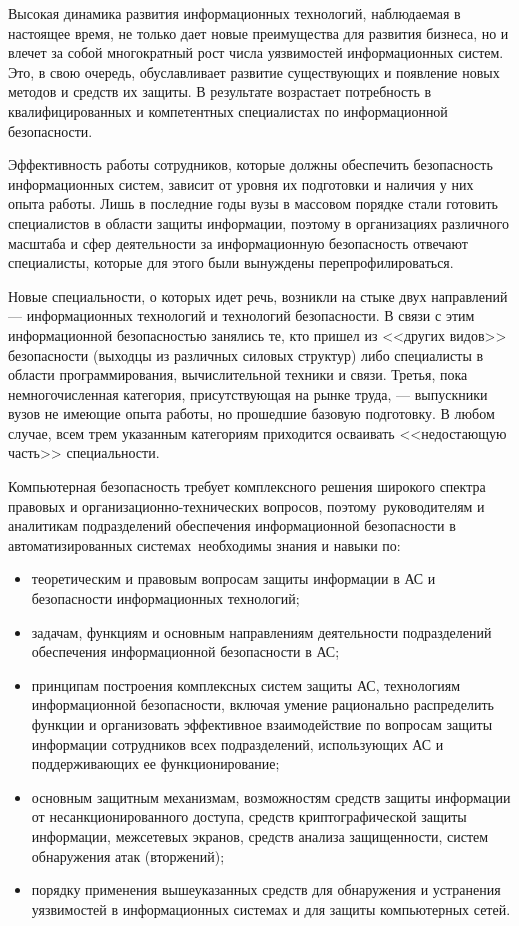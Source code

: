 Высокая динамика развития информационных технологий, наблюдаемая в настоящее время,
не только дает новые преимущества для развития бизнеса,
но и влечет за собой многократный рост числа уязвимостей информационных систем.
Это, в свою очередь, обуславливает развитие существующих и появление новых методов
и средств их защиты. В результате возрастает потребность в квалифицированных
и компетентных специалистах по информационной безопасности.

Эффективность работы сотрудников, которые должны обеспечить безопасность информационных систем,
зависит от уровня их подготовки и наличия у них опыта работы. Лишь в последние годы вузы
в массовом порядке стали готовить специалистов в области защиты информации,
поэтому в организациях различного масштаба и сфер деятельности за информационную безопасность
отвечают специалисты, которые для этого были вынуждены перепрофилироваться.

Новые специальности, о которых идет речь, возникли на стыке двух направлений ---
информационных технологий и технологий безопасности. В связи с этим
информационной безопасностью занялись те, кто пришел из <<других видов>>
безопасности (выходцы из различных силовых структур) либо специалисты в области
программирования, вычислительной техники и связи. Третья, пока немногочисленная
категория, присутствующая на рынке труда, --- выпускники вузов не имеющие опыта работы,
но прошедшие базовую подготовку. В любом случае, всем трем указанным категориям
приходится осваивать <<недостающую часть>> специальности.

Компьютерная безопасность требует комплексного решения широкого спектра
правовых и организационно-технических вопросов, поэтому руководителям
и аналитикам подразделений обеспечения информационной безопасности в автоматизированных
системах необходимы знания и навыки по:


\begin{itemize}
\item теоретическим и правовым вопросам защиты информации в АС и безопасности информационных технологий;
\item задачам, функциям и основным направлениям деятельности подразделений обеспечения информационной безопасности в АС;
\item принципам построения комплексных систем защиты АС, технологиям информационной безопасности,
включая умение рационально распределить функции и организовать эффективное
взаимодействие по вопросам защиты информации сотрудников всех подразделений,
использующих АС и поддерживающих ее функционирование;
\item основным защитным механизмам, возможностям средств защиты информации от несанкционированного доступа,
средств криптографической защиты информации, межсетевых экранов, средств анализа защищенности,
систем обнаружения атак (вторжений);
\item порядку применения вышеуказанных средств для обнаружения и устранения уязвимостей
в информационных системах и для защиты компьютерных сетей.
\end{itemize}

